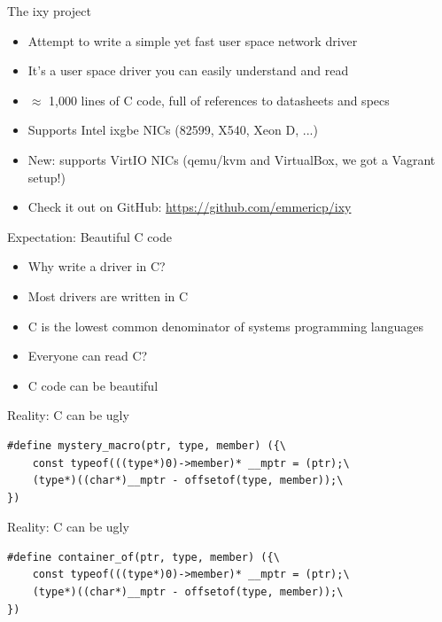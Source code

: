 \documentclass[NET,english,aspectratio=169,notitleframe]{tumbeamer}
\begin{document}
\begin{frame}{The ixy project}
\begin{itemize}
\item Attempt to write a simple yet fast user space network driver
\item It's a user space driver you can easily understand and read
\item $\approx$ 1,000 lines of C code, full of references to datasheets and specs
\item Supports Intel ixgbe NICs (82599, X540, Xeon D, ...)
\item New: supports VirtIO NICs (qemu/kvm and VirtualBox, we got a Vagrant setup!)
\item Check it out on GitHub: \url{https://github.com/emmericp/ixy}
\end{itemize}
\end{frame}


\begin{frame}{Expectation: Beautiful C code}
\begin{itemize}
\item Why write a driver in C?
\pause
\vspace{1em}
\item Most drivers are written in C
\item C is the lowest common denominator of systems programming languages
\item Everyone can read C?
\item C code can be beautiful
\end{itemize}
\end{frame}

\begin{frame}[fragile]{Reality: C can be ugly}
\begin{verbatim}
#define mystery_macro(ptr, type, member) ({\
	const typeof(((type*)0)->member)* __mptr = (ptr);\
	(type*)((char*)__mptr - offsetof(type, member));\
})
\end{verbatim}
\end{frame}

\begin{frame}[fragile]{Reality: C can be ugly}
\begin{verbatim}
#define container_of(ptr, type, member) ({\
	const typeof(((type*)0)->member)* __mptr = (ptr);\
	(type*)((char*)__mptr - offsetof(type, member));\
})
\end{verbatim}
\end{frame}
\end{document}
